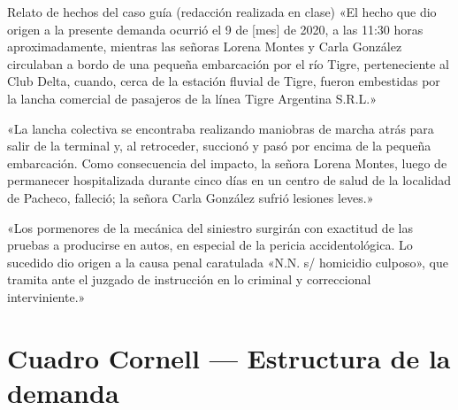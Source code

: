 \documentclass[12pt,oneside]{book}
\begin{document}
\begin{example}{Relato de hechos del caso guía (redacción realizada en clase)}
«El hecho que dio origen a la presente demanda ocurrió el 9 de [mes] de 2020, a las 11:30 horas aproximadamente, mientras las señoras Lorena Montes y Carla González circulaban a bordo de una pequeña embarcación por el río Tigre, perteneciente al Club Delta, cuando, cerca de la estación fluvial de Tigre, fueron embestidas por la lancha comercial de pasajeros de la línea Tigre Argentina S.R.L.»

«La lancha colectiva se encontraba realizando maniobras de marcha atrás para salir de la terminal y, al retroceder, succionó y pasó por encima de la pequeña embarcación. Como consecuencia del impacto, la señora Lorena Montes, luego de permanecer hospitalizada durante cinco días en un centro de salud de la localidad de Pacheco, falleció; la señora Carla González sufrió lesiones leves.»

«Los pormenores de la mecánica del siniestro surgirán con exactitud de las pruebas a producirse en autos, en especial de la pericia accidentológica. Lo sucedido dio origen a la causa penal caratulada «N.N. s/ homicidio culposo», que tramita ante el juzgado de instrucción en lo criminal y correccional interviniente.»
\end{example}


\section*{Cuadro Cornell — Estructura de la demanda}
\end{document}

